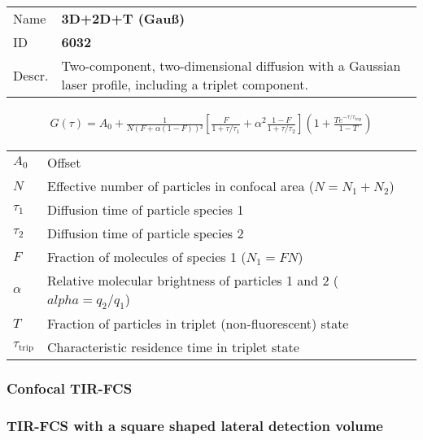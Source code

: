 \begin{samepage}
\noindent \begin{tabular}{lp{}}
Name & \textbf{3D+2D+T (Gauß)} \\ 
ID & \textbf{6032} \\ 
Descr. &  Two-component, two-dimensional diffusion with a Gaussian laser profile, including a triplet component. \\ 
\end{tabular}
\begin{align}
G(\tau) = A_0 + \frac{1}{N (F + \alpha (1-F))²} \left[ \frac{F}{1+\tau/\tau_1} + \alpha^2 \frac{1-F}{ 1+\tau/\tau_2 } \right] \left(1 + \frac{T e^{-\tau/\tau_\mathrm{trip}}}{1-T}  \right) 
\end{align} 
\begin{center}
\begin{tabular}{ll}
$A_0$ & Offset \\ 
$N$ & Effective number of particles in confocal area ($N = N_1+N_2$) \\ 
$\tau_1$ &  Diffusion time of particle species 1 \\ 
$\tau_2$ &  Diffusion time of particle species 2 \\ 
$F$ & Fraction of molecules of species 1 ($N_1 = F N$) \\
$\alpha$ & Relative molecular brightness of particles 1 and 2 ($ alpha = q_2/q_1$) \\
$T$ &  Fraction of particles in triplet (non-fluorescent) state\\ 
$\tau_\mathrm{trip}$ &  Characteristic residence time in triplet state \\ 
\end{tabular}
\end{center}
\end{samepage}
\vspace{2em}

\subsubsection{Confocal TIR-FCS}

\subsubsection{TIR-FCS with a square shaped lateral detection volume}